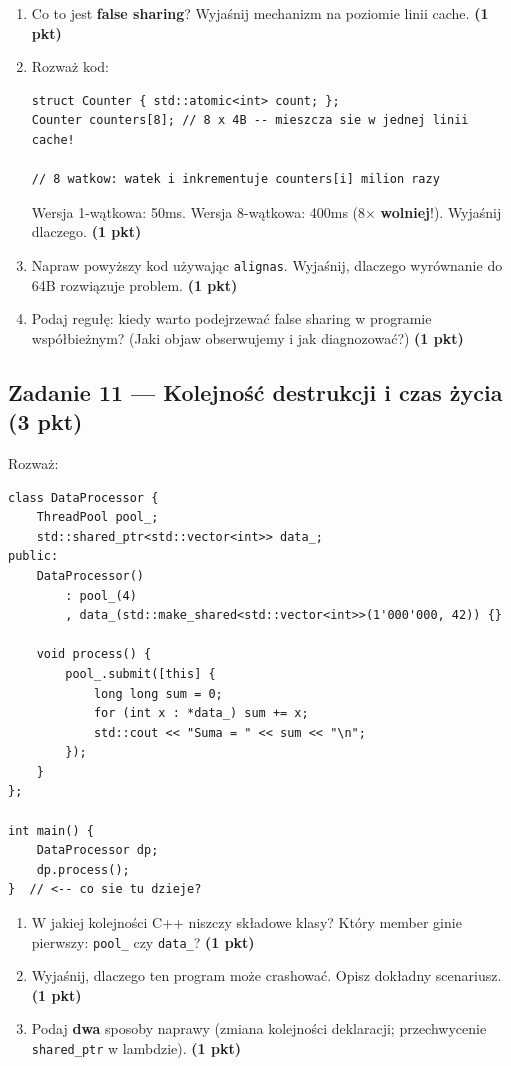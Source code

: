 \documentclass[11pt,a4paper]{article}
\newcommand{\pkt}[1]{\hfill\textbf{(#1 pkt)}}
\begin{document}
\begin{enumerate}[label=(\alph*)]
\item Co to jest \textbf{false sharing}? Wyjaśnij mechanizm na poziomie linii cache. \pkt{1}

\item Rozważ kod:
\begin{lstlisting}
struct Counter { std::atomic<int> count; };
Counter counters[8]; // 8 x 4B -- mieszcza sie w jednej linii cache!

// 8 watkow: watek i inkrementuje counters[i] milion razy
\end{lstlisting}
Wersja 1-wątkowa: 50ms. Wersja 8-wątkowa: 400ms (8$\times$ \textbf{wolniej}!). Wyjaśnij dlaczego. \pkt{1}

\item Napraw powyższy kod używając \texttt{alignas}. Wyjaśnij, dlaczego wyrównanie do 64B rozwiązuje problem. \pkt{1}

\item Podaj regułę: kiedy warto podejrzewać false sharing w programie współbieżnym? (Jaki objaw obserwujemy i jak diagnozować?) \pkt{1}
\end{enumerate}

\subsection*{Zadanie 11 --- Kolejność destrukcji i czas życia \pkt{3}}

Rozważ:
\begin{lstlisting}
class DataProcessor {
    ThreadPool pool_;
    std::shared_ptr<std::vector<int>> data_;
public:
    DataProcessor()
        : pool_(4)
        , data_(std::make_shared<std::vector<int>>(1'000'000, 42)) {}

    void process() {
        pool_.submit([this] {
            long long sum = 0;
            for (int x : *data_) sum += x;
            std::cout << "Suma = " << sum << "\n";
        });
    }
};

int main() {
    DataProcessor dp;
    dp.process();
}  // <-- co sie tu dzieje?
\end{lstlisting}

\begin{enumerate}[label=(\alph*)]
\item W jakiej kolejności C++ niszczy składowe klasy? Który member ginie pierwszy: \texttt{pool\_} czy \texttt{data\_}? \pkt{1}
\item Wyjaśnij, dlaczego ten program może crashować. Opisz dokładny scenariusz. \pkt{1}
\item Podaj \textbf{dwa} sposoby naprawy (zmiana kolejności deklaracji; przechwycenie \texttt{shared\_ptr} w lambdzie). \pkt{1}
\end{enumerate}
\end{document}
